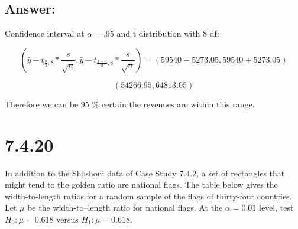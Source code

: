\documentclass[svgnames]{article}
\begin{document}
\subsection*{Answer:}
Confidence interval at $\alpha=.95$ and t distribution with 8 df:

$$(\bar{y}-t_{\frac{\alpha}{2},8}*\frac{s}{\sqrt{n}},\bar{y}-t_{\frac{1-\alpha}{2},8}*\frac{s}{\sqrt{n}})=(59540-5273.05, 59540+5273.05)$$

$$(54266.95,64813.05)$$

Therefore we can be 95 \% certain the revenues are within this range. 

\section{7.4.20}

In addition to the Shoshoni data of Case Study $7.4.2$, a set of rectangles that might tend to the golden ratio are national flags. The table below gives the width-to-length ratios for a random sample of the flags of thirty-four countries. Let $\mu$ be the width-to--length ratio for national flags. At the $\alpha = 0.01$ level, test $H_0 : \mu = 0.618$ versus $H_1 : \mu = 0.618$.
\end{document}
